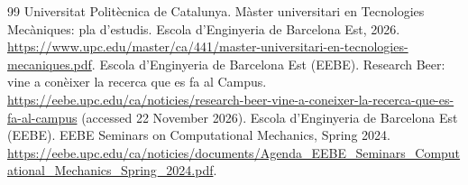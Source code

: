 \documentclass[11pt]{article}
\begin{document}
\begin{thebibliography}{99}
 Universitat Polit\`ecnica de Catalunya. M\`aster universitari en Tecnologies Mec\`aniques: pla d'estudis. Escola d'Enginyeria de Barcelona Est, 2026. \url{https://www.upc.edu/master/ca/441/master-universitari-en-tecnologies-mecaniques.pdf}.
 Escola d'Enginyeria de Barcelona Est (EEBE). Research Beer: vine a con\`eixer la recerca que es fa al Campus. {\def\UrlBreaks{\do\/\do\-}\url{https://eebe.upc.edu/ca/noticies/research-beer-vine-a-coneixer-la-recerca-que-es-fa-al-campus}} (accessed 22 November 2026).
 Escola d'Enginyeria de Barcelona Est (EEBE). EEBE Seminars on Computational Mechanics, Spring 2024. {\def\UrlBreaks{\do\/\do\-}\url{https://eebe.upc.edu/ca/noticies/documents/Agenda_EEBE_Seminars_Computational_Mechanics_Spring_2024.pdf}}.
\end{thebibliography}
\end{document}
